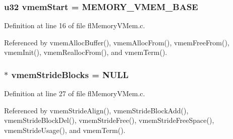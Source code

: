 \subsubsection{\setlength{\rightskip}{0pt plus 5cm}u32 {\bf vmem\-Start} = MEMORY\_\-VMEM\_\-BASE}\label{flMemoryVMem_8c_8ca615adf1b61b83d3787473691f050b}




Definition at line 16 of file fl\-Memory\-VMem.c.

Referenced by vmem\-Alloc\-Buffer(), vmem\-Alloc\-From(), vmem\-Free\-From(), vmem\-Init(), vmem\-Realloc\-From(), and vmem\-Term().
\subsubsection{$\ast$ {\bf vmem\-Stride\-Blocks} = NULL}\label{flMemoryVMem_8c_f76725e6d15a4b7ccf09e2a47b8bd21d}




Definition at line 27 of file fl\-Memory\-VMem.c.

Referenced by vmem\-Stride\-Align(), vmem\-Stride\-Block\-Add(), vmem\-Stride\-Block\-Del(), vmem\-Stride\-Free(), vmem\-Stride\-Free\-Space(), vmem\-Stride\-Usage(), and vmem\-Term().